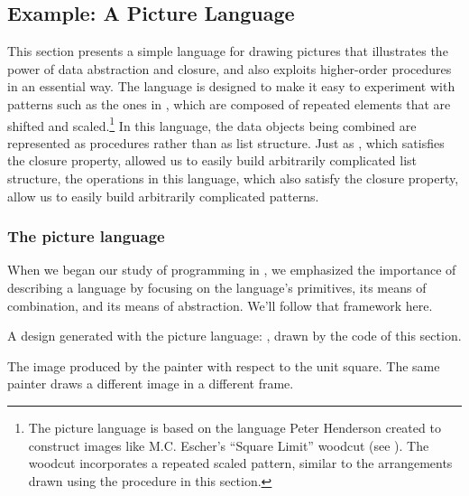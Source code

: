 \subsection{Example: A Picture Language}
\label{Section 2.2.4}

This section presents a simple language for drawing pictures that illustrates
the power of data abstraction and closure, and also exploits higher-order
procedures in an essential way.  The language is designed to make it easy to
experiment with patterns such as the ones in , which are
composed of repeated elements that are shifted and scaled.\footnote{The picture
language is based on the language Peter Henderson created to construct images
like M.C. Escher's ``Square Limit'' woodcut (see ).  The
woodcut incorporates a repeated scaled pattern, similar to the arrangements
drawn using the  procedure in this section.} In this
language, the data objects being combined are represented as procedures rather
than as list structure.  Just as , which satisfies the closure
property, allowed us to easily build arbitrarily complicated list structure,
the operations in this language, which also satisfy the closure property, allow
us to easily build arbitrarily complicated patterns.


\subsubsection*{The picture language}

When we began our study of programming in , we emphasized the
importance of describing a language by focusing on the language's primitives,
its means of combination, and its means of abstraction.  We'll follow that
framework here.

\begin{imageFigure}{A design generated with the picture language:
  , drawn by the code of this section.}
\end{imageFigure}

\begin{imageFigure}
  {%
    The image produced by the  painter with respect to the unit
    square.  The same painter draws a different image in a different frame.
  }%
\end{imageFigure}

